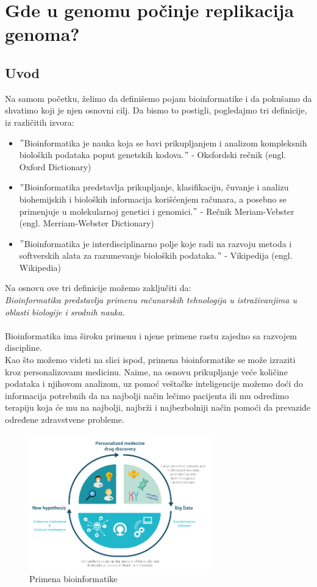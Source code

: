 \chapter{Gde u genomu počinje replikacija genoma?}
\section{Uvod}
\label{sec:uvod}

Na samom početku, želimo da definišemo pojam bioinformatike i da pokušamo da shvatimo koji je njen osnovni cilj. Da bismo to postigli, pogledajmo tri definicije, iz različitih izvora:

\begin{itemize}
  \item $"$Bioinformatika je nauka koja se bavi prikupljanjem i analizom kompleksnih bioloških podataka poput genetskih kodova.$"$ - Oksfordski rečnik (engl. Oxford Dictionary)
  \item $"$Bioinformatika predstavlja prikupljanje, klasifikaciju, čuvanje i analizu biohemijskih i bioloških informacija korišćenjem računara, a posebno se primenjuje u molekularnoj genetici i genomici.$"$ - Rečnik Meriam-Vebster (engl. Merriam-Webster Dictionary) 
 \item $"$Bioinformatika je interdisciplinarno polje koje radi na razvoju metoda i softverskih alata za razumevanje bioloških podataka.$"$ - Vikipedija (engl. Wikipedia) 
\end{itemize}

Na osnovu ove tri definicije možemo zaključiti da:\\
\textit{Bioinformatika predstavlja primenu računarskih tehnologija u istraživanjima u oblasti biologije i srodnih nauka.}\\\\
Bioinformatika ima široku primenu i njene primene rastu zajedno sa razvojem discipline.\\
Kao što možemo videti na slici ispod, primena bioinformatike se može izraziti kroz personalizovanu medicinu. Naime, na osnovu prikupljanje veće količine podataka i njihovom analizom, uz pomoć veštačke inteligencije možemo doći do informacija potrebnih da na najbolji način lečimo pacijenta ili mu odredimo terapiju koja će mu na najbolji, najbrži i najbezbolniji način pomoći da prevaziđe određene zdravstvene probleme.  

\begin{figure}[h]
\caption{Primena bioinformatike}
\centering
\includegraphics[width=0.7\textwidth]{poglavlja/1/slike/Primena.png}
\end{figure} 

